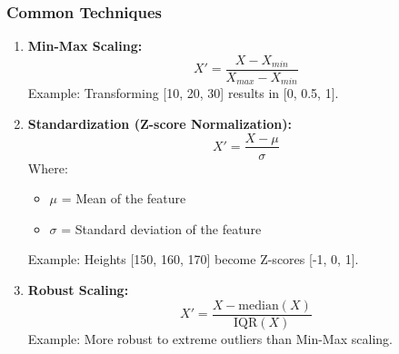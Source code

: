 \documentclass[aspectratio=169]{beamer}
\begin{document}
\begin{frame}[fragile]
    \frametitle{Common Techniques}
    \begin{enumerate}
        \item \textbf{Min-Max Scaling:}
            \begin{equation}
            X' = \frac{X - X_{min}}{X_{max} - X_{min}}
            \end{equation}
            Example: Transforming [10, 20, 30] results in [0, 0.5, 1].
        
        \item \textbf{Standardization (Z-score Normalization):}
            \begin{equation}
            X' = \frac{X - \mu}{\sigma}
            \end{equation}
            Where:
            \begin{itemize}
                \item $\mu$ = Mean of the feature
                \item $\sigma$ = Standard deviation of the feature
            \end{itemize}
            Example: Heights [150, 160, 170] become Z-scores [-1, 0, 1].

        \item \textbf{Robust Scaling:}
            \begin{equation}
            X' = \frac{X - \text{median}(X)}{\text{IQR}(X)}
            \end{equation}
            Example: More robust to extreme outliers than Min-Max scaling.
    \end{enumerate}
\end{frame}
\end{document}
